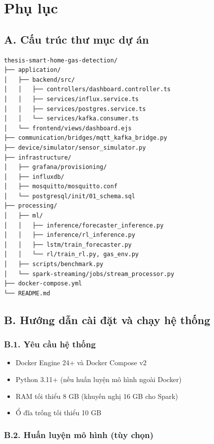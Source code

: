 \chapter*{Phụ lục}

\section*{A. Cấu trúc thư mục dự án}

\begin{verbatim}
thesis-smart-home-gas-detection/
├── application/
│   ├── backend/src/
│   │   ├── controllers/dashboard.controller.ts
│   │   ├── services/influx.service.ts
│   │   ├── services/postgres.service.ts
│   │   └── services/kafka.consumer.ts
│   └── frontend/views/dashboard.ejs
├── communication/bridges/mqtt_kafka_bridge.py
├── device/simulator/sensor_simulator.py
├── infrastructure/
│   ├── grafana/provisioning/
│   ├── influxdb/
│   ├── mosquitto/mosquitto.conf
│   └── postgresql/init/01_schema.sql
├── processing/
│   ├── ml/
│   │   ├── inference/forecaster_inference.py
│   │   ├── inference/rl_inference.py
│   │   ├── lstm/train_forecaster.py
│   │   └── rl/train_rl.py, gas_env.py
│   ├── scripts/benchmark.py
│   └── spark-streaming/jobs/stream_processor.py
├── docker-compose.yml
└── README.md
\end{verbatim}

\section*{B. Hướng dẫn cài đặt và chạy hệ thống}

\subsection*{B.1. Yêu cầu hệ thống}
\begin{itemize}
  \item Docker Engine 24+ và Docker Compose v2
  \item Python 3.11+ (nếu huấn luyện mô hình ngoài Docker)
  \item RAM tối thiểu 8 GB (khuyến nghị 16 GB cho Spark)
  \item Ổ đĩa trống tối thiểu 10 GB
\end{itemize}

\subsection*{B.2. Huấn luyện mô hình (tùy chọn)}

